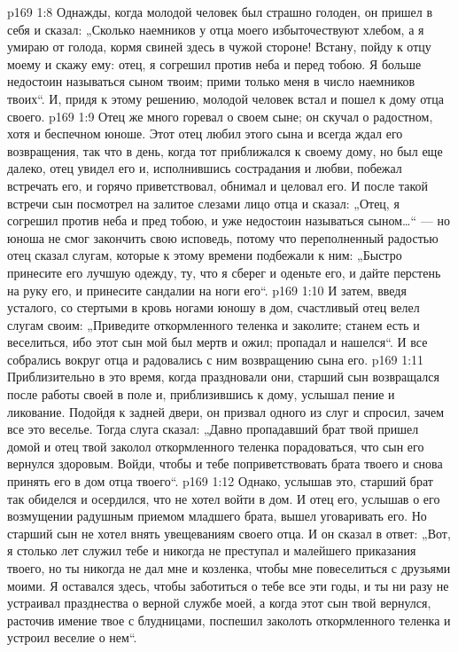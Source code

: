 \vs p169 1:8 Однажды, когда молодой человек был страшно голоден, он пришел в себя и сказал: „Сколько наемников у отца моего избыточествуют хлебом, а я умираю от голода, кормя свиней здесь в чужой стороне! Встану, пойду к отцу моему и скажу ему: отец, я согрешил против неба и перед тобою. Я больше недостоин называться сыном твоим; прими только меня в число наемников твоих“. И, придя к этому решению, молодой человек встал и пошел к дому отца своего.
\vs p169 1:9 Отец же много горевал о своем сыне; он скучал о радостном, хотя и беспечном юноше. Этот отец любил этого сына и всегда ждал его возвращения, так что в день, когда тот приближался к своему дому, но был еще далеко, отец увидел его и, исполнившись сострадания и любви, побежал встречать его, и горячо приветствовал, обнимал и целовал его. И после такой встречи сын посмотрел на залитое слезами лицо отца и сказал: „Отец, я согрешил против неба и пред тобою, и уже недостоин называться сыном\ldots “ --- но юноша не смог закончить свою исповедь, потому что переполненный радостью отец сказал слугам, которые к этому времени подбежали к ним: „Быстро принесите его лучшую одежду, ту, что я сберег и оденьте его, и дайте перстень на руку его, и принесите сандалии на ноги его“.
\vs p169 1:10 И затем, введя усталого, со стертыми в кровь ногами юношу в дом, счастливый отец велел слугам своим: „Приведите откормленного теленка и заколите; станем есть и веселиться, ибо этот сын мой был мертв и ожил; пропадал и нашелся“. И все собрались вокруг отца и радовались с ним возвращению сына его.
\vs p169 1:11 Приблизительно в это время, когда праздновали они, старший сын возвращался после работы своей в поле и, приблизившись к дому, услышал пение и ликование. Подойдя к задней двери, он призвал одного из слуг и спросил, зачем все это веселье. Тогда слуга сказал: „Давно пропадавший брат твой пришел домой и отец твой заколол откормленного теленка порадоваться, что сын его вернулся здоровым. Войди, чтобы и тебе поприветствовать брата твоего и снова принять его в дом отца твоего“.
\vs p169 1:12 Однако, услышав это, старший брат так обиделся и осердился, что не хотел войти в дом. И отец его, услышав о его возмущении радушным приемом младшего брата, вышел уговаривать его. Но старший сын не хотел внять увещеваниям своего отца. И он сказал в ответ: „Вот, я столько лет служил тебе и никогда не преступал и малейшего приказания твоего, но ты никогда не дал мне и козленка, чтобы мне повеселиться с друзьями моими. Я оставался здесь, чтобы заботиться о тебе все эти годы, и ты ни разу не устраивал празднества о верной службе моей, а когда этот сын твой вернулся, расточив имение твое с блудницами, поспешил заколоть откормленного теленка и устроил веселие о нем“.
